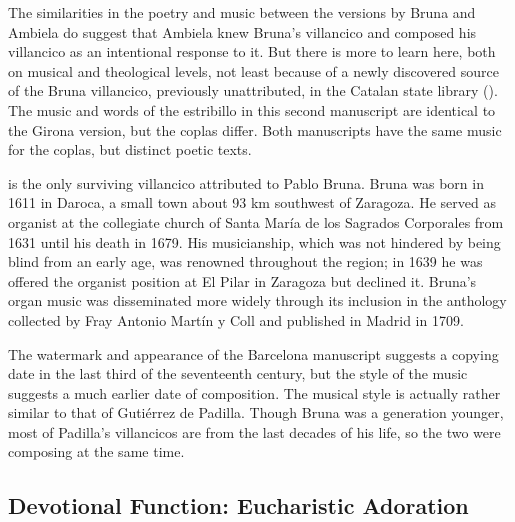 The similarities in the poetry and music between the versions by Bruna and
Ambiela do suggest that Ambiela knew Bruna's villancico and composed his
villancico as an intentional response to it.
But there is more to learn here, both on musical and theological levels, not
least because of a newly discovered source of the Bruna villancico, previously
unattributed, in the Catalan state library ().
The music and words of the estribillo in this second manuscript are identical to
the Girona version, but the coplas differ.  
Both manuscripts have the same music for the coplas, but distinct poetic texts.

 is the only surviving villancico attributed to Pablo
Bruna.
Bruna was born in 1611 in Daroca, a small town about 93 km southwest of
Zaragoza.
He served as organist at the collegiate church of Santa María de los Sagrados
Corporales from 1631 until his death in 1679.%
	\Autocite[104]{Calahorra:Aragon}
His musicianship, which was not hindered by being blind from an early age, was
renowned throughout the region; in 1639 he was offered the organist position at
El Pilar in Zaragoza but declined it.%
    \Autocite[123--125]{Calahorra:Aragon}
Bruna's organ music was disseminated more widely through its inclusion in the
anthology  collected by Fray
Antonio Martín y Coll and published in Madrid in 1709.

The watermark and appearance of the Barcelona manuscript suggests a copying date
in the last third of the seventeenth century, but the style of the music
suggests a much earlier date of composition.  
The musical style is actually rather similar to that of Gutiérrez de Padilla. 
Though Bruna was a generation younger, most of Padilla's villancicos are from
the last decades of his life, so the two were composing at the same time.

\subsection{Devotional Function: Eucharistic Adoration}

